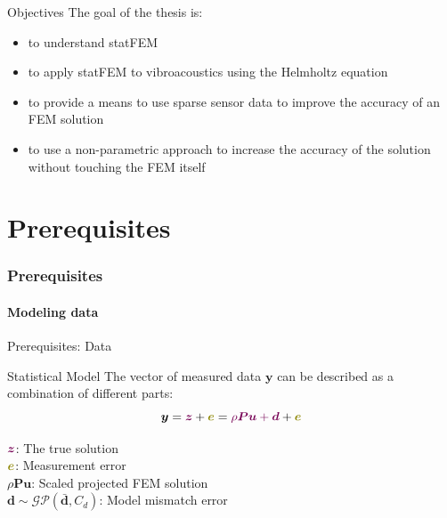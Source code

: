 \documentclass[fleqn,11pt,aspectratio=43]{beamer}
\begin{document}
\begin{frame}{Objectives}
The goal of the thesis is:
\begin{itemize}
	\item to understand statFEM
 	\item to apply statFEM to vibroacoustics using the Helmholtz equation
  \item to provide a means to use sparse sensor data to improve the accuracy of an FEM solution
  \item to use a non-parametric approach to increase the accuracy of the solution without touching the FEM itself
\end{itemize}

\end{frame}

\part{Prerequisites}
\begin{frame}[plain]
  \partpage
\end{frame}





\section{Prerequisites}




\subsection{Modeling data}
\begin{frame}{Prerequisites: Data}

\begin{block}{Statistical Model}
The vector of measured data $\bm{y}$ can be described as a combination of different parts:
\begin{equation}
\bm{y} = \textcolor{DGTU}{\bm{z}} + \textcolor{olive}{\bm{e}} = \textcolor{DGTU}{\rho \bm{P} \bm{u} + \bm{d}} + \textcolor{olive}{\bm{e}}
\end{equation}
\end{block}
$\textcolor{DGTU}{\bm{z}}$: The true solution\\
$\textcolor{olive}{\bm{e}}$: Measurement error\\
$\rho \bm{P} \bm{u}$: Scaled projected FEM solution\\

$\bm{d} \sim \mathcal{GP}(\bar{\bm{d}}, C_d)$: Model mismatch error
\end{frame}
\end{document}
